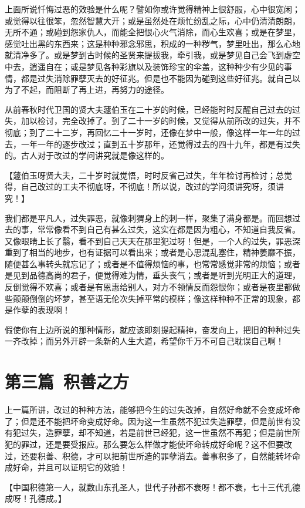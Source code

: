 \documentclass[12pt,twoside,openany]{book}
\newcommand{\kai}[1]{{\CJKfamily{kai}#1}}
\begin{document}
上面所说忏悔过恶的效验是什么呢？譬如你或许觉得精神上很舒服，心中很宽闲；或觉得以往很笨，忽然智慧大开；或是虽然处在烦忙纷乱之际，心中仍清清朗朗，无所不通；或碰到怨家仇人，而能全把恨心火气消除，而心生欢喜；或是在梦里，感觉吐出黑的东西来；这是种种邪念邪思，积成的一种秽气，梦里吐出，那么心地就清净多了。或是梦到古时候的圣贤来提拔我，牵引我，或是梦见自己会飞到虚空中去，逍遥自在；或是梦见各种彩旗以及装饰珍宝的伞盖，这种种少有少见的事情，都是过失消除罪孽灭去的好征兆。但是也不能因为碰到这些好征兆。就自己以为了不起，而阻断了再上进，再努力的途径。

从前春秋时代卫国的贤大夫蘧伯玉在二十岁的时候，已经能时时反醒自己过去的过失，加以检讨，完全改掉了。到了二十一岁的时候，又觉得从前所改的过失，并不彻底；到了二十二岁，再回忆二十一岁时，还像在梦中一般，像这样一年一年的过去，一年一年的逐步改过；直到五十岁那年，还觉得过去的四十九年，都是有过失的。古人对于改过的学问讲究就是像这样的。

【\kai{蘧伯玉呀贤大夫，二十岁时就觉悟，时时反省己过失，年年检讨再检讨；总觉得，自己改过的工夫不彻底呀，不彻底！所以说，改过的学问须讲究呀，须讲究！}】

我们都是平凡人，过失罪恶，就像刺猬身上的刺一样，聚集了满身都是。而回想过去的事，常常像看不到自己有甚么过失，这实在都是因为粗心，不知道自我反省。又像眼睛上长了翳，看不到自己天天在那里犯过呀！但是，一个人的过失，罪恶深重到了相当的地步，也有证据可以看出来；或者是心思混乱塞住，精神萎靡不振，随便甚么事转头就忘记了；或者是不值得烦恼的事，也常常感觉非常的烦恼；或者是见到品德高尚的君子，便觉得难为情，垂头丧气；或者是听到光明正大的道理，反倒觉得不欢喜；或者是有恩惠给别人，对方不领情反而怨恨你；或者是夜里都做些颠颠倒倒的坏梦，甚至语无伦次失掉平常的模样；像这样种种不正常的现象，都是作孽的表现啊！

假使你有上边所说的那种情形，就应该即刻提起精神，奋发向上，把旧的种种过失一齐改掉；而另外开辟一条新的人生大道，希望你千万不可自己耽误自己啊！

\chapter{第三篇\ 积善之方}
上一篇所讲，改过的种种方法，能够把今生的过失改掉，自然好命就不会变成坏命了；但是还不能把坏命变成好命。因为这一生虽然不犯过失造罪孽，但是前世有没有犯过失，造罪孽，却不知道，若是前世已经犯，这一世虽然不再犯；但是前世所犯的罪过，还是要受报应。那么要怎么样做才能使坏命转成好命呢？这不但要改过，还要积善、积德，才可以把前世所造的罪孽消去。善事积多了，自然能转坏命成好命，并且可以证明它的效验！

【\kai{中国积德第一人，就数山东孔圣人，世代子孙都不衰呀！都不衰，七十三代孔德成呀！孔德成。}】
\end{document}
